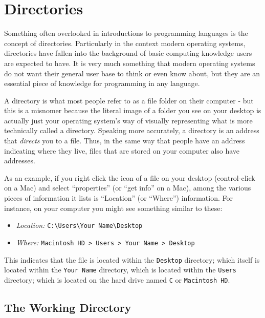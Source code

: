 \section{Directories}
\label{sec:dir}

Something often overlooked in introductions to programming languages is the concept of directories. Particularly in the context modern operating systems, directories have fallen into the background of basic computing knowledge users are expected to have. It is very much something that modern operating systems do not want their general user base to think or even know about, but they are an essential piece of knowledge for programming in any language.

A \gls{directory} is what most people refer to as a file folder on their computer - but this is a misnomer because the literal image of a folder you see on your desktop is actually just your operating system's way of visually representing what is more technically called a directory. Speaking more accurately, a directory is an address that \textit{directs} you to a file. Thus, in the same way that people have an address indicating where they live, files that are stored on your computer also have addresses.

As an example, if you right click the icon of a file on your desktop (control-click on a Mac) and select ``properties'' (or ``get info'' on a Mac), among the various pieces of information it lists is ``Location'' (or ``Where'') information.  For instance, on your computer you might see something similar to these:

\begin{itemize}
    \item \textit{Location:} \texttt{C:\textbackslash Users\textbackslash Your Name\textbackslash Desktop}
    \item \textit{Where:} \texttt{Macintosh HD > Users > Your Name > Desktop}
\end{itemize}

\noindent This indicates that the file is located within the \texttt{Desktop} directory; which itself is located within the \texttt{Your Name} directory, which is located within the \texttt{Users} directory; which is located on the hard drive named \texttt{C} or \texttt{Macintosh HD}.

\subsection{The Working Directory}

